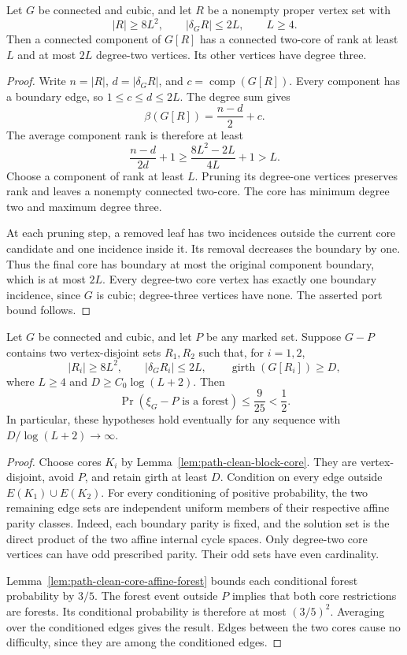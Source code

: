 \begin{lemma}
\label{lem:path-clean-block-core}
Let $G$ be connected and cubic, and let $R$ be a nonempty proper vertex set with
\[
 |R|\ge8L^2,
 \qquad |\delta_G R|\le2L,
 \qquad L\ge4.
\]
Then a connected component of $G[R]$ has a connected two-core of rank at least $L$ and at most $2L$ degree-two vertices.
Its other vertices have degree three.
\end{lemma}

\begin{proof}
Write $n=|R|$, $d=|\delta_G R|$, and $c=\operatorname{comp}(G[R])$.
Every component has a boundary edge, so $1\le c\le d\le2L$.
The degree sum gives
\[
 \beta(G[R])=\frac{n-d}{2}+c.
\]
The average component rank is therefore at least
\[
 \frac{n-d}{2d}+1
 \ge\frac{8L^2-2L}{4L}+1>L.
\]
Choose a component of rank at least $L$.
Pruning its degree-one vertices preserves rank and leaves a nonempty connected two-core.
The core has minimum degree two and maximum degree three.

At each pruning step, a removed leaf has two incidences outside the current core candidate and one incidence inside it.
Its removal decreases the boundary by one.
Thus the final core has boundary at most the original component boundary, which is at most $2L$.
Every degree-two core vertex has exactly one boundary incidence, since $G$ is cubic; degree-three vertices have none.
The asserted port bound follows.
\end{proof}

\begin{proposition}
\label{prop:path-two-clean-blocks}
Let $G$ be connected and cubic, and let $P$ be any marked set.
Suppose $G-P$ contains two vertex-disjoint sets $R_1,R_2$ such that, for $i=1,2$,
\[
 |R_i|\ge8L^2,
 \qquad |\delta_G R_i|\le2L,
 \qquad\operatorname{girth}(G[R_i])\ge D,
\]
where $L\ge4$ and $D\ge C_0\log(L+2)$.
Then
\[
 \Pr(\xi_G-P\text{ is a forest})\le\frac9{25}<\frac12.
\]
In particular, these hypotheses hold eventually for any sequence with $D/\log(L+2)\to\infty$.
\end{proposition}

\begin{proof}
Choose cores $K_i$ by Lemma~\ref{lem:path-clean-block-core}.
They are vertex-disjoint, avoid $P$, and retain girth at least $D$.
Condition on every edge outside $E(K_1)\cup E(K_2)$.
For every conditioning of positive probability, the two remaining edge sets are independent uniform members of their respective affine parity classes.
Indeed, each boundary parity is fixed, and the solution set is the direct product of the two affine internal cycle spaces.
Only degree-two core vertices can have odd prescribed parity.
Their odd sets have even cardinality.

Lemma~\ref{lem:path-clean-core-affine-forest} bounds each conditional forest probability by $3/5$.
The forest event outside $P$ implies that both core restrictions are forests.
Its conditional probability is therefore at most $(3/5)^2$.
Averaging over the conditioned edges gives the result.
Edges between the two cores cause no difficulty, since they are among the conditioned edges.
\end{proof}
